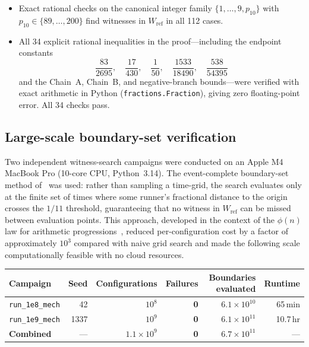 \documentclass[12pt,a4paper]{amsart}
\theoremstyle{definition}
\theoremstyle{remark}
\newcommand{\Wref}{W_{\mathrm{ref}}}
\begin{document}
\begin{itemize}
  \item Exact rational checks on the canonical integer family $\{1,\ldots,9,p_{10}\}$
        with $p_{10}\in\{89,\ldots,200\}$ find witnesses in $\Wref$ in all 112 cases.
  \item All 34 explicit rational inequalities in the proof---including the endpoint
        constants
        \[
          \frac{83}{2695},\quad\frac{17}{430},\quad\frac{1}{50},\quad
          \frac{1533}{18490},\quad\frac{538}{54395}
        \]
        and the Chain~A, Chain~B, and negative-branch bounds---were verified with
        exact arithmetic in Python (\texttt{fractions.Fraction}), giving zero
        floating-point error.  All 34 checks pass.
\end{itemize}

\subsection*{Large-scale boundary-set verification}

Two independent witness-search campaigns were conducted on an Apple M4 MacBook Pro
(10-core CPU, Python~3.14).  The event-complete boundary-set method of~\cite{Pal26}
was used: rather than sampling a time-grid, the search evaluates only at the finite
set of times where some runner's fractional distance to the origin crosses the
$1/11$ threshold, guaranteeing that no witness in $\Wref$ can be missed between
evaluation points.  This approach, developed in the context of the $\phi(n)$ law for
arithmetic progressions~\cite{Pal26}, reduced per-configuration cost by a factor of
approximately $10^{3}$ compared with naive grid search and made the following scale
computationally feasible with no cloud resources.

\begin{center}
\begin{tabular}{lrrrrr}
\hline
Campaign & Seed & Configurations & Failures & Boundaries evaluated & Runtime \\
\hline
\texttt{run\_1e8\_mech} & 42   & $10^{8}$ & \textbf{0} & $6.1\times10^{10}$ & 65\,min \\
\texttt{run\_1e9\_mech} & 1337 & $10^{9}$ & \textbf{0} & $6.1\times10^{11}$ & 10.7\,hr \\
\hline
\textbf{Combined}       & ---  & $1.1\times10^{9}$ & \textbf{0} & $6.7\times10^{11}$ & --- \\
\hline
\end{tabular}
\end{center}
\end{document}
